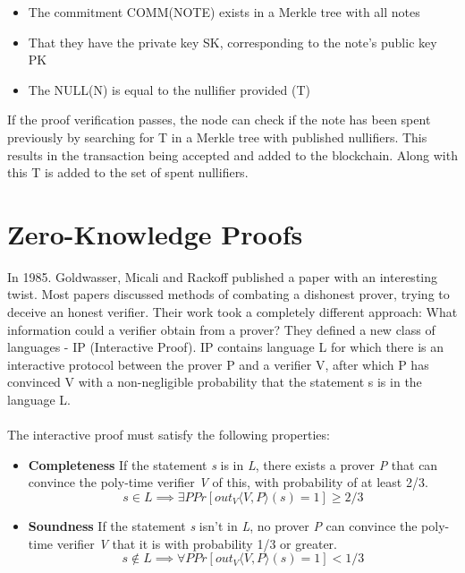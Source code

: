 \begin{itemize}
    \item The commitment COMM(NOTE) exists in a Merkle tree with all notes
    \item That they have the private key SK, corresponding to the note's public key PK
    \item The NULL(N) is equal to the nullifier provided (T)
\end{itemize}

If the proof verification passes, the node can check if the note has been spent previously by searching for T in a Merkle tree with published nullifiers. This results in the transaction being accepted and added to the blockchain. Along with this T is added to the set of spent nullifiers.


\section{Zero-Knowledge Proofs}

In 1985. Goldwasser, Micali and Rackoff published a paper with an interesting twist.\cite{goldwasser1985knowledge} Most papers discussed methods of combating a dishonest prover, trying to deceive an honest verifier. Their work took a completely different approach: What information could a verifier obtain from a prover? They defined a new class of languages - IP (Interactive Proof). IP contains language L for which there is an interactive protocol between the prover P and a verifier V, after which P has convinced V with a non-negligible probability that the statement s is in the language L.\\
\\
The interactive proof must satisfy the following properties:
\begin{itemize}
    \item \textbf{Completeness} If the statement \textit{s} is in \textit{L}, there exists a prover \textit{P} that can convince the poly-time verifier \textit{V} of this, with probability of at least 2/3.
    $$ s \in L \implies \exists P Pr[out_V \langle V, P \rangle (s) = 1 ] \geq 2/3 $$
    \item \textbf{Soundness} If the statement \textit{s} isn't in \textit{L}, no prover \textit{P} can convince the poly-time verifier \textit{V} that it is with probability 1/3 or greater.
    $$ s \notin L \implies \forall P Pr[out_V \langle V, P \rangle (s) = 1 ] < 1/3 $$
\end{itemize}

